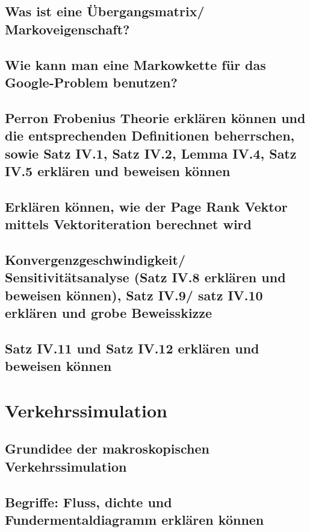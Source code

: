 \documentclass[]{article}
\begin{document}
\subsection*{Was ist eine Übergangsmatrix/ Markoveigenschaft?}

\subsection*{Wie kann man eine Markowkette für das Google-Problem benutzen? }

\subsection*{Perron Frobenius Theorie erklären können und die entsprechenden Definitionen beherrschen, sowie Satz IV.1, Satz IV.2, Lemma IV.4, Satz IV.5 erklären und beweisen können}

\subsection*{Erklären können, wie der Page Rank Vektor mittels Vektoriteration berechnet wird}

\subsection*{Konvergenzgeschwindigkeit/ Sensitivitätsanalyse (Satz IV.8 erklären und beweisen können), Satz IV.9/ satz IV.10 erklären und grobe Beweisskizze}

\subsection*{Satz IV.11 und Satz IV.12 erklären und beweisen können}

\section{Verkehrssimulation}

\subsection*{Grundidee der makroskopischen Verkehrssimulation}

\subsection*{Begriffe: Fluss, dichte und Fundermentaldiagramm erklären können}
\end{document}
